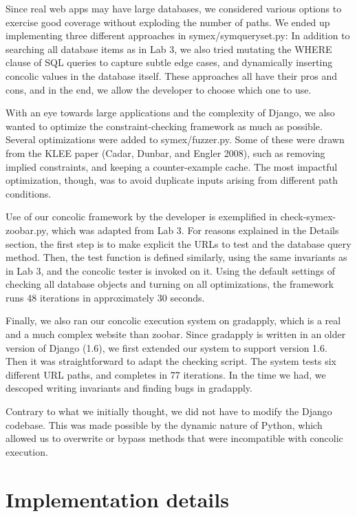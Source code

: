 \documentclass{scrartcl}
\begin{document}
Since real web apps may have large databases, we considered various
options to exercise good coverage without exploding the number of
paths. We ended up implementing three different approaches in
symex/symqueryset.py: In addition to searching all database items as
in Lab 3, we also tried mutating the WHERE clause of SQL queries to
capture subtle edge cases, and dynamically inserting concolic values
in the database itself. These approaches all have their pros and cons,
and in the end, we allow the developer to choose which one to use.

With an eye towards large applications and the complexity of Django,
we also wanted to optimize the constraint-checking framework as much
as possible. Several optimizations were added to symex/fuzzer.py. Some
of these were drawn from the KLEE paper (Cadar, Dunbar, and Engler
2008), such as removing implied constraints, and keeping a
counter-example cache. The most impactful optimization, though, was
to avoid duplicate inputs arising from different path conditions.

Use of our concolic framework by the developer is exemplified in
check-symex-zoobar.py, which was adapted from Lab 3. For reasons
explained in the Details section, the first step is to make explicit
the URLs to test and the database query method. Then, the test
function is defined similarly, using the same invariants as in Lab 3,
and the concolic tester is invoked on it. Using the default settings
of checking all database objects and turning on all optimizations, the
framework runs 48 iterations in approximately 30 seconds.

Finally, we also ran our concolic execution system on gradapply, which
is a real and a much complex website than zoobar. Since gradapply is
written in an older version of Django (1.6), we first extended our
system to support version 1.6. Then it was straightforward to adapt
the checking script. The system tests six different URL paths, and
completes in 77 iterations. In the time we had, we descoped writing
invariants and finding bugs in gradapply.

Contrary to what we initially thought, we did not have to modify the
Django codebase. This was made possible by the dynamic nature of
Python, which allowed us to overwrite or bypass methods that were
incompatible with concolic execution.


\section{Implementation details}
\end{document}
